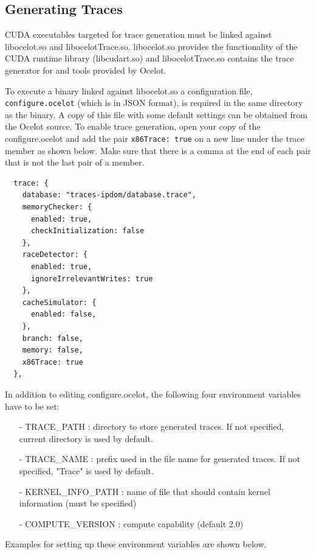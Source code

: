 \subsection{Generating Traces}

CUDA executables targeted for trace generation must be linked against
libocelot.so and libocelotTrace.so. libocelot.so provides the functionality of
the CUDA runtime library (libcudart.so) and libocelotTrace.so contains the
trace generator for \SIM and tools provided by Ocelot.

To execute a binary linked against libocelot.so a configuration file,
\Verb+configure.ocelot+ (which is in JSON format), is required in the same
directory as the binary. A copy of this file with some default settings can
be obtained from the Ocelot source. To enable trace generation, open your
copy of the configure.ocelot and add the pair \Verb+x86Trace: true+ on a new
line under the trace member as shown below.  Make sure that there is a comma
at the end of each pair that is not the last pair of a member.

\begin{Verbatim}
  trace: {
    database: "traces-ipdom/database.trace",
    memoryChecker: {
      enabled: true,
      checkInitialization: false
    },
    raceDetector: {
      enabled: true,
      ignoreIrrelevantWrites: true
    },
    cacheSimulator: {
      enabled: false,
    },
    branch: false,
    memory: false,
    x86Trace: true
  },
\end{Verbatim}

In addition to editing configure.ocelot, the following four environment
variables have to be set:

\begin{itemize}\itemsep2pt
\item[-] TRACE\_PATH : directory to store generated traces. If not specified, current directory is used by default.
\item[-] TRACE\_NAME : prefix used in the file name for generated traces. If not specified, "Trace" is used by default.
\item[-] KERNEL\_INFO\_PATH : name of file that should contain kernel information (must be specified)
\item[-] COMPUTE\_VERSION : compute capability (default 2.0)
\end{itemize}


Examples for setting up these environment variables are shown below.

